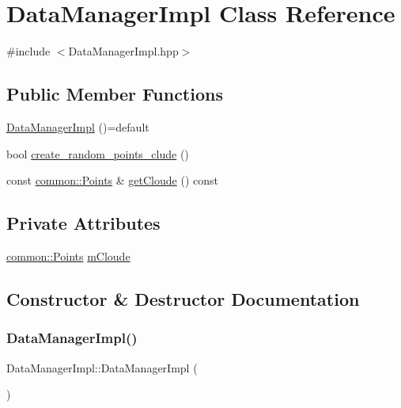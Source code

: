 \hypertarget{classDataManagerImpl}{}\section{Data\+Manager\+Impl Class Reference}
\label{classDataManagerImpl}


{\ttfamily \#include $<$Data\+Manager\+Impl.\+hpp$>$}

\subsection*{Public Member Functions}
\begin{DoxyCompactItemize}
\item 
\mbox{\hyperlink{classDataManagerImpl_a909cdeec67d56e06aed12b659375e94a}{Data\+Manager\+Impl}} ()=default
\item 
bool \mbox{\hyperlink{classDataManagerImpl_a726a882efc72b98c0357be1ae3f21a57}{create\+\_\+random\+\_\+points\+\_\+clude}} ()
\item 
const \mbox{\hyperlink{namespacecommon_a1aefa0cce5e127612ab7ca981276ab7e}{common\+::\+Points}} \& \mbox{\hyperlink{classDataManagerImpl_aec9fee3f8963693cbe6c6c6a6c2ddcff}{get\+Cloude}} () const
\end{DoxyCompactItemize}
\subsection*{Private Attributes}
\begin{DoxyCompactItemize}
\item 
\mbox{\hyperlink{namespacecommon_a1aefa0cce5e127612ab7ca981276ab7e}{common\+::\+Points}} \mbox{\hyperlink{classDataManagerImpl_a24c28355207eb567a68814641d1549ee}{m\+Cloude}}
\end{DoxyCompactItemize}


\subsection{Constructor \& Destructor Documentation}
\mbox{\label{classDataManagerImpl_a909cdeec67d56e06aed12b659375e94a}} 
\subsubsection{\texorpdfstring{Data\+Manager\+Impl()}{DataManagerImpl()}}
{\footnotesize\ttfamily Data\+Manager\+Impl\+::\+Data\+Manager\+Impl (\begin{DoxyParamCaption}{ }\end{DoxyParamCaption})\hspace{0.3cm}{\ttfamily [default]}}




